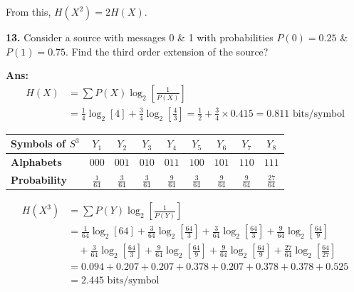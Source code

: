 \documentclass[12pt]{article}
\begin{document}
From this, $H(X^2) = 2 H(X)$.

\vspace{0.5cm}
\textbf{13.} Consider a source with messages 0 \& 1 with probabilities $P(0) = 0.25$ \& $P(1) = 0.75$. Find the third order extension of the source?

\textbf{Ans:}
\begin{align*}
	H(X) & = \sum P(X) \log_2 \left[ \frac{1}{P(X)} \right]                                                                                        \\
	     & = \frac{1}{4}\log_2[4] + \frac{3}{4}\log_2\left[\frac{4}{3}\right] = \frac{1}{2} + \frac{3}{4} \times 0.415 = 0.811 \text{ bits/symbol}
\end{align*}

\begin{table}[ht]
	\centering
	\renewcommand{\arraystretch}{1.5}
	\begin{tabular}{|l|c|c|c|c|c|c|c|c|}
		\hline
		\cellcolor{black!10}\textbf{Symbols of $S^3$} & $Y_1$          & $Y_2$          & $Y_3$          & $Y_4$          & $Y_5$          & $Y_6$          & $Y_7$          & $Y_8$           \\ \hline
		\cellcolor{black!10}\textbf{Alphabets}        & $000$          & $001$          & $010$          & $011$          & $100$          & $101$          & $110$          & $111$           \\ \hline
		\cellcolor{black!10}\textbf{Probability}      & $\frac{1}{64}$ & $\frac{3}{64}$ & $\frac{3}{64}$ & $\frac{9}{64}$ & $\frac{3}{64}$ & $\frac{9}{64}$ & $\frac{9}{64}$ & $\frac{27}{64}$ \\ \hline
	\end{tabular}
\end{table}

\begin{align*}
	H(X^3) & = \sum P(Y) \log_2 \left[ \frac{1}{P(Y)} \right]                                                                                                                                                \\
	       & = \frac{1}{64}\log_2[64] + \frac{3}{64}\log_2\left[\frac{64}{3}\right] + \frac{3}{64}\log_2\left[\frac{64}{3}\right] + \frac{9}{64}\log_2\left[\frac{64}{9}\right]                              \\
	       & \quad + \frac{3}{64}\log_2\left[\frac{64}{3}\right] + \frac{9}{64}\log_2\left[\frac{64}{9}\right] + \frac{9}{64}\log_2\left[\frac{64}{9}\right] + \frac{27}{64}\log_2\left[\frac{64}{27}\right] \\
	       & = 0.094 + 0.207 + 0.207 + 0.378 + 0.207 + 0.378 + 0.378 + 0.525                                                                                                                                 \\
	       & = 2.445 \text{ bits/symbol}
\end{align*}
\end{document}
